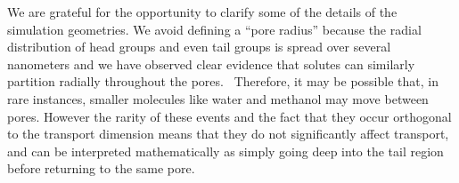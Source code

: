 \documentclass{article}
\begin{document}
\begin{enumerate}[label={Comment \theenumi :}, leftmargin=3.9\parindent]


    We are grateful for the opportunity to clarify some of the details of the simulation 
    geometries. We avoid defining a ``pore radius'' because the radial distribution of 
    head groups and even tail groups is spread over several nanometers and we have
    observed clear evidence that solutes can similarly partition radially throughout 
    the pores.~\cite{coscia_understanding_2019,coscia_chemically_2019} 
    Therefore, it may be possible that, in rare instances, smaller molecules like water and
    methanol may move between pores. However the rarity of these events and the fact that 
    they occur orthogonal to the transport dimension means that they do not significantly 
    affect transport, and can be interpreted mathematically as simply going deep into the 
    tail region before returning to the same pore.
    

\end{enumerate}
\end{document}
